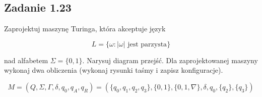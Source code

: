 \documentclass[leqno]{article}
\begin{document}
        \subsection{Zadanie 1.23}
    
            Zaprojektuj maszynę Turinga, która akceptuje język

            \begin{equation}
                L = \{\omega:|\omega| \text{ jest parzysta}\}
            \end{equation}

            nad alfabetem $\Sigma=\{0,1\}$. Narysuj diagram przejść. 
            Dla zaprojektowanej maszyny wykonaj 
            dwa obliczenia (wykonaj rysunki taśmy i zapisz konfiguracje).
            
            \begin{equation}
                M = (Q, \Sigma, \Gamma, \delta, q_0, q_A, q_R) = (
                    \{q_0, q_1, q_2, q_3\}, 
                    \{0, 1\}, 
                    \{0, 1, \nabla\}, 
                    \delta, 
                    q_0, 
                    \{q_2\}, 
                    \{q_3\}
                )
            \end{equation}

            \begin{center}
            \end{center}
\end{document}
